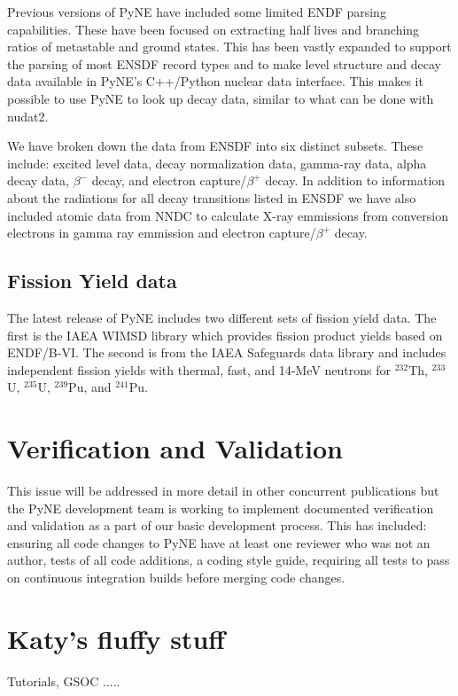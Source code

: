 \documentclass{anstrans}
\begin{document}
Previous versions of PyNE have included some limited ENDF parsing capabilities. These have been focused on extracting half lives and branching ratios of metastable and ground states. This has been vastly expanded to support the parsing of most ENSDF record types and to make level structure and decay data available in PyNE's C++/Python nuclear data interface. This makes it possible to use PyNE to look up decay data, similar to what can be done with nudat2. 

We have broken down the data from ENSDF into six distinct subsets. These include: excited level data, decay normalization data, gamma-ray data, alpha decay data, $\beta^-$ decay, and electron capture/$\beta^+$ decay. In addition to information about the radiations for all decay transitions listed in ENSDF we have also included atomic data from NNDC to calculate X-ray emmissions from conversion electrons in gamma ray emmission and electron capture/$\beta^+$ decay.

\subsection{Fission Yield data}

The latest release of PyNE includes two different sets of fission yield data. The first is the IAEA WIMSD library which provides fission product yields based on ENDF/B-VI. The second is from the IAEA Safeguards data library and includes independent fission yields with thermal, fast, and 14-MeV neutrons for $^{232}$Th, $^{233}$U, $^{235}$U, $^{239}$Pu, and $^{241}$Pu.

\section{Verification and Validation}

This issue will be addressed in more detail in other concurrent publications but the PyNE development team is working to implement documented verification and validation as a part of our basic development process. This has included: ensuring all code changes to PyNE have at least one reviewer who was not an author, tests of all code additions, a coding style guide, requiring all tests to pass on continuous integration builds before merging code changes. 

\section{Katy's fluffy stuff} Tutorials, GSOC .....
\end{document}
